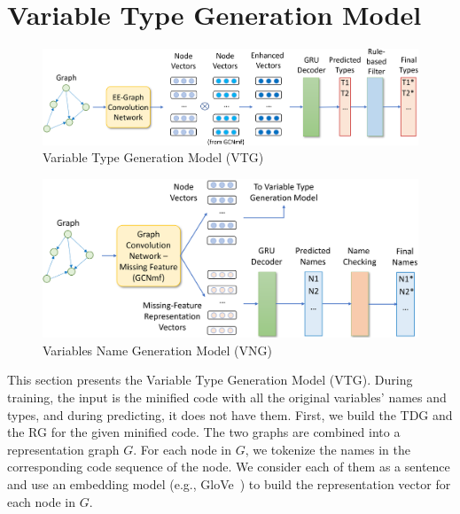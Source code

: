 \section{Variable Type Generation Model}
\label{sec:type-gen}

\begin{figure}[ht]
	\begin{center}
	  \includegraphics[width=4.8in]{figures/type-gen-model-2}
          \vspace{-10pt}
		\caption{Variable Type Generation Model (VTG)}
		\label{fig:type-gen}
	\end{center}
\end{figure}

\begin{figure}[h]
	\begin{center}
	  \includegraphics[width=4.6in]{figures/name-gen-model}
          \vspace{-10pt}
		\caption{Variables Name Generation Model (VNG)}
		\label{fig:name-gen}
	\end{center}
\end{figure}

This section presents the Variable Type Generation Model (VTG). During
training, the input is the minified code with all the original
variables’ names and types, and during predicting, it does not have
them. First, we build the TDG and the RG for the given minified code.
The two graphs are combined into a representation graph $G$. For each
node in $G$, we tokenize the names in the corresponding code sequence
of the node. We consider each of them as a sentence and use an
embedding model (e.g., GloVe~\cite{pennington2014glove}) to build the
representation vector for each node in $G$.

